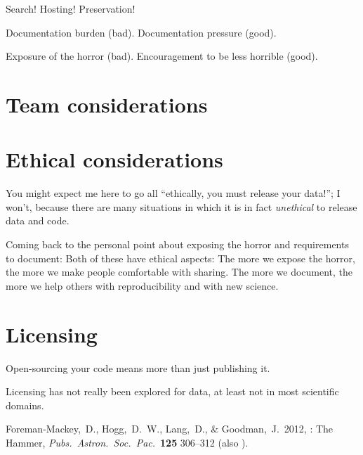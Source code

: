 \documentclass[12pt,twoside,pdftex]{article}
\begin{document}
Search! Hosting! Preservation!

Documentation burden (bad). Documentation pressure (good).

Exposure of the horror (bad). Encouragement to be less horrible (good).

\section{Team considerations}

\section{Ethical considerations}

You might expect me here to go all ``ethically, you must release your
data!''; I won't, because there are many situations in which it is in
fact \emph{unethical} to release data and code.

Coming back to the personal point about exposing the horror and
requirements to document: Both of these have ethical aspects: The more
we expose the horror, the more we make people comfortable with
sharing. The more we document, the more we help others with
reproducibility and with new science.

\section{Licensing}

Open-sourcing your code means more than just publishing it.

Licensing has not really been explored for data, at least not in most
scientific domains.

\clearpage
{}\theendnotes

\clearpage
\raggedright
\begin{thebibliography}{}
  Foreman-Mackey,~D., Hogg,~D.~W., Lang,~D., \& Goodman,~J.\ 2012,
  : The  Hammer,
  \textit{Pubs.\ Astron.\ Soc.\ Pac.}\ \textbf{125} 306--312
  (also ).
\end{thebibliography}
\end{document}
